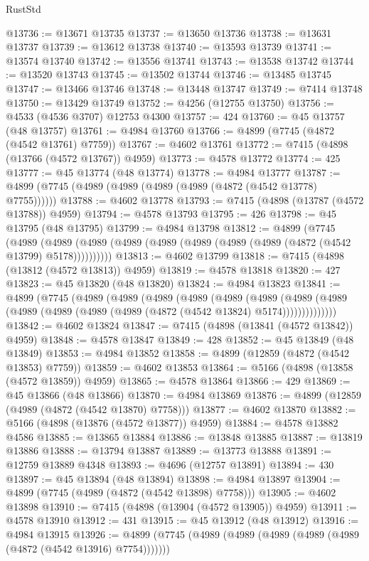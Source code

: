 \begin{lexlean}{RustStd}
\begin{coremodule}
@13736 := @13671 @13735
@13737 := @13650 @13736
@13738 := @13631 @13737
@13739 := @13612 @13738
@13740 := @13593 @13739
@13741 := @13574 @13740
@13742 := @13556 @13741
@13743 := @13538 @13742
@13744 := @13520 @13743
@13745 := @13502 @13744
@13746 := @13485 @13745
@13747 := @13466 @13746
@13748 := @13448 @13747
@13749 := @7414 @13748
@13750 := @13429 @13749
@13752 := @4256 (@12755 @13750)
@13756 := @4533 (@4536 @3707) @12753 @4300
@13757 := 424
@13760 := @45 @13757 (@48 @13757)
@13761 := @4984 @13760
@13766 := @4899 (@7745 (@4872 (@4542 @13761) @7759))
@13767 := @4602 @13761
@13772 := @7415 (@4898 (@13766 (@4572 @13767)) @4959)
@13773 := @4578 @13772
@13774 := 425
@13777 := @45 @13774 (@48 @13774)
@13778 := @4984 @13777
@13787 := @4899 (@7745 (@4989 (@4989 (@4989 (@4989 (@4872 (@4542 @13778) @7755))))))
@13788 := @4602 @13778
@13793 := @7415 (@4898 (@13787 (@4572 @13788)) @4959)
@13794 := @4578 @13793
@13795 := 426
@13798 := @45 @13795 (@48 @13795)
@13799 := @4984 @13798
@13812 := @4899
    (@7745
      (@4989 (@4989 (@4989 (@4989 (@4989 (@4989 (@4989 (@4989 (@4872 (@4542 @13799) @5178))))))))))
@13813 := @4602 @13799
@13818 := @7415 (@4898 (@13812 (@4572 @13813)) @4959)
@13819 := @4578 @13818
@13820 := 427
@13823 := @45 @13820 (@48 @13820)
@13824 := @4984 @13823
@13841 := @4899
    (@7745
      (@4989
        (@4989
          (@4989
            (@4989
              (@4989
                (@4989
                  (@4989
                    (@4989 (@4989 (@4989 (@4989 (@4989 (@4872 (@4542 @13824) @5174))))))))))))))
@13842 := @4602 @13824
@13847 := @7415 (@4898 (@13841 (@4572 @13842)) @4959)
@13848 := @4578 @13847
@13849 := 428
@13852 := @45 @13849 (@48 @13849)
@13853 := @4984 @13852
@13858 := @4899 (@12859 (@4872 (@4542 @13853) @7759))
@13859 := @4602 @13853
@13864 := @5166 (@4898 (@13858 (@4572 @13859)) @4959)
@13865 := @4578 @13864
@13866 := 429
@13869 := @45 @13866 (@48 @13866)
@13870 := @4984 @13869
@13876 := @4899 (@12859 (@4989 (@4872 (@4542 @13870) @7758)))
@13877 := @4602 @13870
@13882 := @5166 (@4898 (@13876 (@4572 @13877)) @4959)
@13884 := @4578 @13882 @4586
@13885 := @13865 @13884
@13886 := @13848 @13885
@13887 := @13819 @13886
@13888 := @13794 @13887
@13889 := @13773 @13888
@13891 := @12759 @13889 @4348
@13893 := @4696 (@12757 @13891)
@13894 := 430
@13897 := @45 @13894 (@48 @13894)
@13898 := @4984 @13897
@13904 := @4899 (@7745 (@4989 (@4872 (@4542 @13898) @7758)))
@13905 := @4602 @13898
@13910 := @7415 (@4898 (@13904 (@4572 @13905)) @4959)
@13911 := @4578 @13910
@13912 := 431
@13915 := @45 @13912 (@48 @13912)
@13916 := @4984 @13915
@13926 := @4899 (@7745 (@4989 (@4989 (@4989 (@4989 (@4989 (@4872 (@4542 @13916) @7754)))))))

\end{coremodule}
\end{lexlean}
